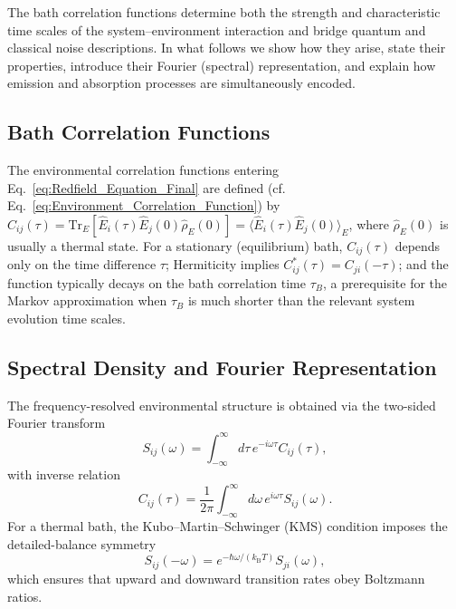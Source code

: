 The bath correlation functions determine both the strength and characteristic time scales of the system--environment interaction and bridge quantum and classical noise descriptions. In what follows we show how they arise, state their properties, introduce their Fourier (spectral) representation, and explain how emission and absorption processes are simultaneously encoded.

\subsection{Bath Correlation Functions}
\label{subsec:bath_correlation_functions}

The environmental correlation functions entering Eq.~\eqref{eq:Redfield_Equation_Final} are defined (cf. Eq.~\eqref{eq:Environment_Correlation_Function}) by $C_{ij}(\tau) = \mathrm{Tr}_E[\hat{E}_i(\tau) \hat{E}_j(0) \hat{\rho}_E(0)] = \langle \hat{E}_i(\tau) \hat{E}_j(0) \rangle_E$, where $\hat{\rho}_E(0)$ is usually a thermal state. For a stationary (equilibrium) bath, $C_{ij}(\tau)$ depends only on the time difference $\tau$; Hermiticity implies $C_{ij}^*(\tau)=C_{ji}(-\tau)$; and the function typically decays on the bath correlation time $\tau_B$, a prerequisite for the Markov approximation when $\tau_B$ is much shorter than the relevant system evolution time scales.

\subsection{Spectral Density and Fourier Representation}
\label{subsec:spectral_density_representation}

The frequency-resolved environmental structure is obtained via the two-sided Fourier transform
\begin{equation}
S_{ij}(\omega) = \int_{-\infty}^{\infty} d\tau \, e^{-i\omega \tau} C_{ij}(\tau),
\label{eq:spectral_density}
\end{equation}
with inverse relation
\begin{equation}
C_{ij}(\tau) = \frac{1}{2\pi} \int_{-\infty}^{\infty} d\omega \, e^{i\omega \tau} S_{ij}(\omega).
\label{eq:inverse_spectral_density}
\end{equation}
For a thermal bath, the Kubo--Martin--Schwinger (KMS) condition imposes the detailed-balance symmetry
\begin{equation}
S_{ij}(-\omega) = e^{-\hbar\omega/(k_{\mathrm{B}} T)} S_{ji}(\omega),
\label{eq:kms_spectral_relation}
\end{equation}
which ensures that upward and downward transition rates obey Boltzmann ratios.


